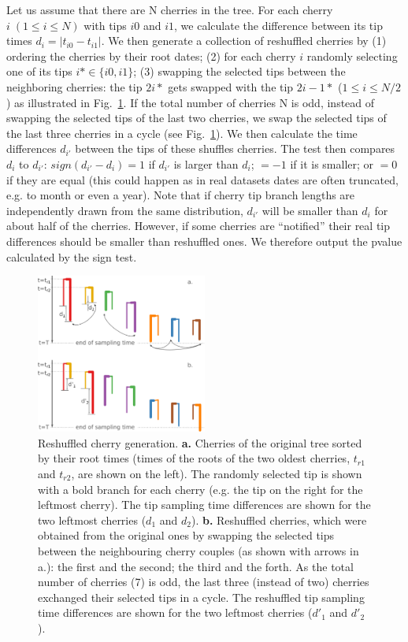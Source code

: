 \documentclass[10pt,letterpaper]{article}
\begin{document}
Let us assume that there are N cherries in the tree. For each cherry $i\;(1 \leq i \leq N)$ with tips $i0$ and $i1$, we calculate the difference between its tip times $d_i = |t_{i0} - t_{i1}|$. We then generate a collection of reshuffled cherries by (1) ordering the cherries by their root dates; (2) for each cherry $i$ randomly selecting one of its tips $i* \in \{i0, i1\}$; (3) swapping the selected tips between the neighboring cherries: the tip $2i*$ gets swapped with the tip $2i-1*$ ($1 \leq i \leq N / 2$) as illustrated in Fig.~\ref{fig:tipswap}. If the total number of cherries N is odd, instead of swapping the selected tips of the last two cherries, we swap the selected tips of the last three cherries in a cycle (see Fig.~\ref{fig:tipswap}). We then calculate the time differences $d_{i'}$ between the tips of these shuffles cherries. 
The test then compares $d_i$ to $d_{i'}$: $sign(d_{i'} - d_i) = 1$ if $d_{i'}$ is larger than $d_i$; $= -1$ if it is smaller; or $= 0$ if they are equal (this could happen as in real datasets dates are often truncated, e.g. to month or even a year). Note that if cherry tip branch lengths are independently drawn from the same distribution, $d_{i'}$ will be smaller than $d_i$ for about half of the cherries. However, if some cherries are ``notified'' their real tip differences should be smaller than reshuffled ones. We therefore output the pvalue calculated by the sign test.


\begin{figure}[tbhp]
\centering 
\includegraphics[width=0.5\textwidth]{Fig_cherryswap.png}
\caption{Reshuffled cherry generation. \textbf{a.} Cherries of the original tree sorted by their root times (times of the roots of the two oldest cherries, $t_{r1}$ and $t_{r2}$, are shown on the left). The randomly selected tip is shown with a bold branch for each cherry (e.g. the tip on the right for the leftmost cherry). The tip sampling time differences are shown for the two leftmost cherries ($d_1$ and $d_2$). \textbf{b.} Reshuffled cherries, which were obtained from the original ones by swapping the selected tips between the neighbouring cherry couples (as shown with arrows in a.): the first and the second; the third and the forth. As the total number of cherries (7) is odd, the last three (instead of two) cherries exchanged their selected tips in a cycle. The reshuffled tip sampling time differences are shown for the two leftmost cherries ($d'_1$ and $d'_2$).}
\label{fig:tipswap} 
\end{figure}
\end{document}
